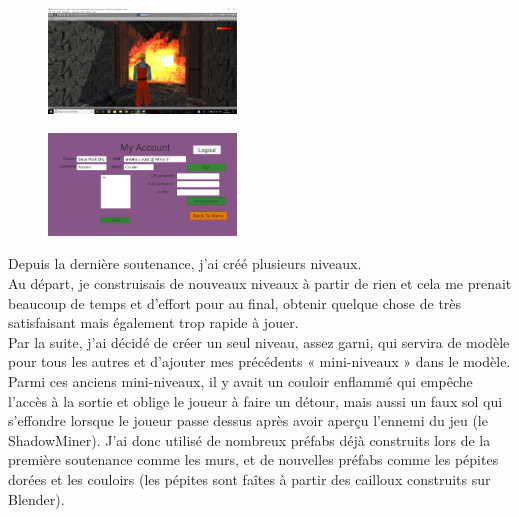 \documentclass[titlepage, 13px, a4paper]{report}
\begin{document}
\paragraph{} \hspace{0pt} \\
\begin{figure}
	\centering
	\includegraphics[width=5cm]{image/antoine_levelflamme.png}
\end{figure}
\begin{figure}
	\centering
	\includegraphics[width=5cm]{image/antoine_myaccount.png}
\end{figure}
Depuis la dernière soutenance, j'ai créé plusieurs niveaux. \\
Au départ, je construisais de nouveaux niveaux à partir de rien et cela me prenait beaucoup de temps et d'effort pour au final,  
obtenir quelque chose de très satisfaisant mais également trop rapide à jouer. \\
Par la suite, j'ai décidé de créer un seul niveau, 
assez garni, qui servira de modèle pour tous les autres et d'ajouter mes précédents « mini-niveaux » dans le modèle. 
Parmi ces anciens mini-niveaux, il y avait un couloir enflammé qui empêche l'accès à la sortie et oblige le joueur à faire un détour, 
mais aussi un faux sol qui s’effondre lorsque le joueur passe dessus après avoir aperçu l'ennemi du jeu (le ShadowMiner). J'ai donc 
utilisé de nombreux préfabs déjà construits lors de la première soutenance comme les murs, et de nouvelles préfabs 
comme les pépites dorées et les couloirs (les pépites sont faîtes à partir des cailloux construits sur Blender). \\ \\
\end{document}
